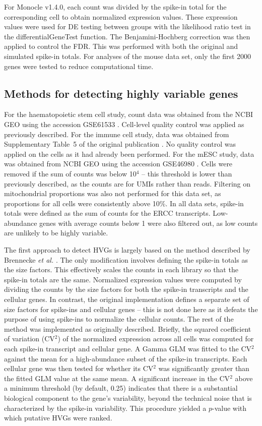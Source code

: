 \documentclass{article}
\begin{document}
For Monocle v1.4.0, each count was divided by the spike-in total for the corresponding cell to obtain normalized expression values.
These expression values were used for DE testing between groups with the likelihood ratio test in the differentialGeneTest function.
The Benjamini-Hochberg correction was then applied to control the FDR.
This was performed with both the original and simulated spike-in totals.
For analyses of the mouse data set, only the first 2000 genes were tested to reduce computational time.

\subsection{Methods for detecting highly variable genes}
For the haematopoietic stem cell study, count data was obtained from the NCBI GEO using the accession GSE61533 \cite{wilson2015combined}.
Cell-level quality control was applied as previously described.
For the immune cell study, data was obtained from Supplementary Table~5 of the original publication \cite{brennecke2013accounting}.
No quality control was applied on the cells as it had already been performed.
For the mESC study, data was obtained from NCBI GEO using the accession GSE46980 \cite{islam2014quantitative}.
Cells were removed if the sum of counts was below 10$^4$ -- this threshold is lower than previously described, as the counts are for UMIs rather than reads.
Filtering on mitochondrial proportions was also not performed for this data set, as proportions for all cells were consistently above 10\%.
In all data sets, spike-in totals were defined as the sum of counts for the ERCC transcripts.
Low-abundance genes with average counts below 1 were also filtered out, as low counts are unlikely to be highly variable.

The first approach to detect HVGs is largely based on the method described by Brennecke \textit{et al.} \cite{brennecke2013accounting}.
The only modification involves defining the spike-in totals as the size factors.
This effectively scales the counts in each library so that the spike-in totals are the same.
Normalized expression values were computed by dividing the counts by the size factors for both the spike-in transcripts and the cellular genes.
In contrast, the original implementation defines a separate set of size factors for spike-ins and cellular genes -- this is not done here as it defeats the purpose of using spike-ins to normalize the cellular counts.
The rest of the method was implemented as originally described.
Briefly, the squared coefficient of variation (CV$^2$) of the normalized expression across all cells was computed for each spike-in transcript and cellular gene.
A Gamma GLM was fitted to the CV$^2$ against the mean for a high-abundance subset of the spike-in transcripts.
Each cellular gene was then tested for whether its CV$^2$ was significantly greater than the fitted GLM value at the same mean.
A significant increase in the CV$^2$ above a minimum threshold (by default, 0.25) indicates that there is a substantial biological component to the gene's variability, beyond the technical noise that is characterized by the spike-in variability.
This procedure yielded a $p$-value with which putative HVGs were ranked.
\end{document}
